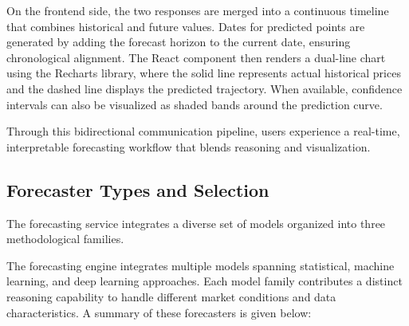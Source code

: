 On the frontend side, the two responses are merged into a continuous timeline that combines historical and future values.  
Dates for predicted points are generated by adding the forecast horizon to the current date, ensuring chronological alignment.  
The React component then renders a dual-line chart using the Recharts library, where the solid line represents actual historical prices and the dashed line displays the predicted trajectory.  
When available, confidence intervals can also be visualized as shaded bands around the prediction curve. 

Through this bidirectional communication pipeline, users experience a real-time, interpretable forecasting workflow that blends reasoning and visualization.

\subsection{Forecaster Types and Selection}

The forecasting service integrates a diverse set of models organized into three methodological families. 

The forecasting engine integrates multiple models spanning statistical, machine learning, and deep learning approaches.  
Each model family contributes a distinct reasoning capability to handle different market conditions and data characteristics.  
A summary of these forecasters is given below:

